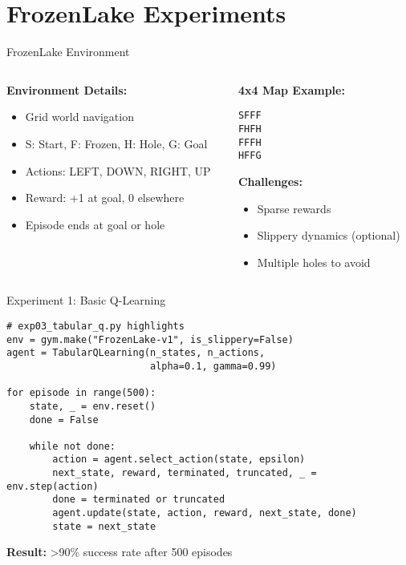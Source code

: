 \documentclass[aspectratio=169,10pt]{beamer}
\begin{document}
\section{FrozenLake Experiments}

\begin{frame}[fragile]{FrozenLake Environment}
\begin{columns}[T]
\begin{column}{0.5\textwidth}
\textbf{Environment Details:}
\begin{itemize}
    \item Grid world navigation
    \item S: Start, F: Frozen, H: Hole, G: Goal
    \item Actions: LEFT, DOWN, RIGHT, UP
    \item Reward: +1 at goal, 0 elsewhere
    \item Episode ends at goal or hole
\end{itemize}
\end{column}
\begin{column}{0.5\textwidth}
\textbf{4x4 Map Example:}
\begin{verbatim}
SFFF
FHFH
FFFH
HFFG
\end{verbatim}
\textbf{Challenges:}
\begin{itemize}
    \item Sparse rewards
    \item Slippery dynamics (optional)
    \item Multiple holes to avoid
\end{itemize}
\end{column}
\end{columns}
\end{frame}

\begin{frame}[fragile]{Experiment 1: Basic Q-Learning}
\begin{lstlisting}
# exp03_tabular_q.py highlights
env = gym.make("FrozenLake-v1", is_slippery=False)
agent = TabularQLearning(n_states, n_actions, 
                         alpha=0.1, gamma=0.99)

for episode in range(500):
    state, _ = env.reset()
    done = False
    
    while not done:
        action = agent.select_action(state, epsilon)
        next_state, reward, terminated, truncated, _ = env.step(action)
        done = terminated or truncated
        agent.update(state, action, reward, next_state, done)
        state = next_state
\end{lstlisting}
\textbf{Result:} >90\% success rate after 500 episodes
\end{frame}
\end{document}
